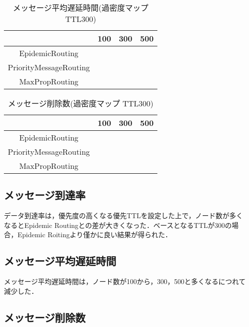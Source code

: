 \documentclass[11pt]{icsthesis}
\begin{document}
\begin{table}[H]
 \begin{center}
      \caption[]{メッセージ平均遅延時間(過密度マップ TTL300)}
      \label{kamituTtl300latencyavg}
      \begin{tabular}{|c|c|c|c|}
\hline
&100&300&500\\
\hline
EpidemicRouting&&&\\
\hline
PriorityMessageRouting&&&\\
\hline
MaxPropRouting&&&\\
\hline
      \end{tabular}
    \end{center}
\end{table}

\begin{table}[H]
 \begin{center}
      \caption[]{メッセージ削除数(過密度マップ TTL300)}
      \label{kamituTtl300dropped}
      \begin{tabular}{|c|c|c|c|}
\hline
&100&300&500\\
\hline
EpidemicRouting&&&\\
\hline
PriorityMessageRouting&&&\\
\hline
MaxPropRouting&&&\\
\hline
      \end{tabular}
    \end{center}
\end{table}
\subsection{メッセージ到達率}
データ到達率は，優先度の高くなる優先TTLを設定した上で，ノード数が多くなるとEpidemic Routingとの差が大きくなった．ベースとなるTTLが300の場合，Epidemic Roitingより僅かに良い結果が得られた．
\subsection{メッセージ平均遅延時間}
メッセージ平均遅延時間は，ノード数が100から，300，500と多くなるにつれて減少した．
\subsection{メッセージ削除数}
\end{document}

